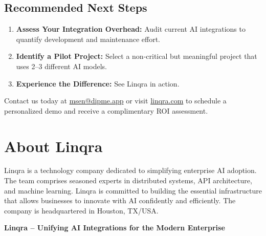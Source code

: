 \documentclass[11pt,a4paper]{article}
\begin{document}
\subsection*{Recommended Next Steps}
\begin{enumerate}[leftmargin=*]
  \item \textbf{Assess Your Integration Overhead:} Audit current AI integrations to quantify development and maintenance effort.
  \item \textbf{Identify a Pilot Project:} Select a non-critical but meaningful project that uses 2--3 different AI models.
  \item \textbf{Experience the Difference:} See Linqra in action.
\end{enumerate}

Contact us today at \href{mailto:msen@dipme.app}{msen@dipme.app} or visit \href{https://linqra.com}{linqra.com} to schedule a personalized demo and receive a complimentary ROI assessment.

\newpage
\section{About Linqra}
Linqra is a technology company dedicated to simplifying enterprise AI adoption. The team comprises seasoned experts in distributed systems, API architecture, and machine learning. Linqra is committed to building the essential infrastructure that allows businesses to innovate with AI confidently and efficiently. The company is headquartered in Houston, TX/USA.

\vspace{0.5cm}
\begin{center}
\textbf{Linqra -- Unifying AI Integrations for the Modern Enterprise}
\end{center}
\end{document}
